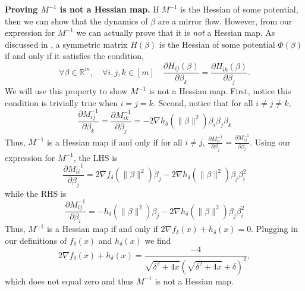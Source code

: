\documentclass{article}
\theoremstyle{plain}
\theoremstyle{definition}
\theoremstyle{remark}
\begin{document}
\textbf{Proving $M^{-1}$ is not a Hessian map.}
%
If $M^{-1}$ is the Hessian of some potential, then we can show that the dynamics of $\beta$ are a mirror flow.
%
However, from our expression for $M^{-1}$ we can actually prove that it is \emph{not} a Hessian map.
%
As discussed in \citet{gunasekar2021mirrorless}, a symmetric matrix $H(\beta)$ is the Hessian of some potential $\Phi(\beta)$ if and only if it satisfies the condition,
\begin{equation}
    \forall \beta\in \mathbb{R}^m, \quad \forall i,j,k \in [m] \quad 
    \frac{\partial H_{ij}(\beta)}{\partial \beta_k } = \frac{\partial H_{ik}(\beta)}{\partial \beta_j }.
\end{equation}
We will use this property to show $M^{-1}$ is not a Hessian map.
%
First, notice this condition is trivially true when $i = j = k$.
%
Second, notice that for all $i \neq j \neq k$,  
\begin{equation}
    \frac{\partial M^{-1}_{ij}}{\partial \beta_k } = \frac{\partial M^{-1}_{ik}}{\partial \beta_j } = -2\nabla h_\delta\left(\|\beta\|^2\right) \beta_i\beta_j\beta_k
\end{equation}
Thus, $M^{-1}$ is a Hessian map if and only if for all $i \neq j$, $\frac{\partial M^{-1}_{ii}}{\partial \beta_j} = \frac{\partial M^{-1}_{ij}}{\partial \beta_i}$.
%
Using our expression for $M^{-1}$, the LHS is
\begin{equation}
    \frac{\partial M^{-1}_{ii}}{\partial \beta_j} = 2\nabla f_\delta\left(\|\beta\|^2\right) \beta_j - 2\nabla h_\delta\left(\|\beta\|^2\right) \beta_j\beta_i^2
\end{equation}
while the RHS is
\begin{equation}
    \frac{\partial M^{-1}_{ij}}{\partial \beta_i} = -h_\delta\left(\|\beta\|^2\right) \beta_j - 2\nabla h_\delta\left(\|\beta\|^2\right) \beta_j\beta_i^2
\end{equation}
Thus, $M^{-1}$ is a Hessian map if and only if $2\nabla f_\delta(x) + h_\delta(x) = 0$.
%
Plugging in our definitions of $f_\delta(x)$ and $h_\delta(x)$ we find
\begin{equation}
    \label{eq:hessian-condition-f-h}
    2\nabla f_\delta(x) + h_\delta(x) = \frac{-4}{\sqrt{\delta^2 + 4x}(\sqrt{\delta^2 + 4x} + \delta)^2},
\end{equation}
which does not equal zero and thus $M^{-1}$ is not a Hessian map.
\end{document}
